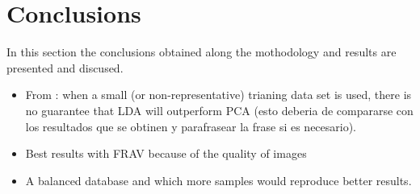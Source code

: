 \section{Conclusions}
In this section the conclusions obtained along the mothodology and results are presented and discused.

\begin{itemize}
\item From \cite{PCAvsLDA}: when a small (or non-representative) trianing data set is used, there is no guarantee that LDA will outperform PCA (esto deberia de compararse con los resultados que se obtinen y parafrasear la frase si es necesario).
\item Best results with FRAV because of the quality of images
\item A balanced database and which more samples would reproduce better results.
\end{itemize}
